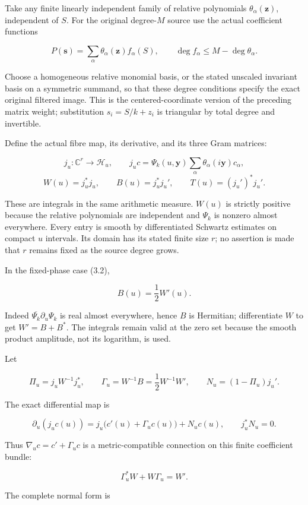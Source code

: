 \documentclass[
]{article}
\begin{document}
Take any finite linearly independent family of relative polynomials
\(\theta_\alpha(\mathbf z)\), independent of \(S\). For the original
degree-\(M\) source use the actual coefficient functions

\[P(\mathbf s)=\sum_\alpha\theta_\alpha(\mathbf z)f_\alpha(S),\qquad
\deg f_\alpha\le M-\deg\theta_\alpha.\tag{4.1}\]

Choose a homogeneous relative monomial basis, or the stated unscaled
invariant basis on a symmetric summand, so that these degree conditions
specify the exact original filtered image. This is the
centered-coordinate version of the preceding matrix weight; substitution
\(s_i=S/k+z_i\) is triangular by total degree and invertible.

Define the actual fibre map, its derivative, and its three Gram
matrices:

\[j_u:\mathbb C^r\to\mathscr H_u,\qquad j_uc=\Psi_k(u,\mathbf y)\sum_\alpha\theta_\alpha(i\mathbf y)c_\alpha,\]
\[W(u)=j_u^*j_u,\qquad B(u)=j_u^*j_u',\qquad T(u)=(j_u')^*j_u'.\tag{4.2}\]

These are integrals in the same arithmetic measure. \(W(u)\) is strictly
positive because the relative polynomials are independent and \(\Psi_k\)
is nonzero almost everywhere. Every entry is smooth by differentiated
Schwartz estimates on compact \(u\) intervals. Its domain has its stated
finite size \(r\); no assertion is made that \(r\) remains fixed as the
source degree grows.

In the fixed-phase case (3.2),

\[B(u)=\frac12W'(u).\tag{4.3}\]

Indeed \(\overline{\Psi_k}\partial_u\Psi_k\) is real almost everywhere,
hence \(B\) is Hermitian; differentiate \(W\) to get \(W'=B+B^*\). The
integrals remain valid at the zero set because the smooth product
amplitude, not its logarithm, is used.

Let

\[\Pi_u=j_uW^{-1}j_u^*,\qquad
\Gamma_u=W^{-1}B=\frac12W^{-1}W',\qquad
N_u=(1-\Pi_u)j_u'.\tag{4.4}\]

The exact differential map is

\[\boxed{\partial_u(j_uc(u))=j_u\bigl(c'(u)+\Gamma_uc(u)\bigr)+N_uc(u),\qquad j_u^*N_u=0.}\tag{4.5}\]

Thus \(\nabla_uc=c'+\Gamma_uc\) is a metric-compatible connection on
this finite coefficient bundle:

\[\Gamma_u^*W+W\Gamma_u=W'.\tag{4.6}\]

The complete normal form is
\end{document}
